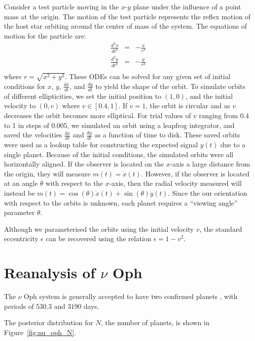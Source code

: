 \documentclass[useAMS,usenatbib]{mn2e}
\begin{document}
Consider a test particle moving in the $x$-$y$ plane under the influence of a
point mass at the origin. The motion of the test particle represents the
reflex motion of the host star orbiting around the center of mass of the
system. The equations of motion for the particle are:
\begin{eqnarray}
\frac{d^2x}{dt^2} &=& -\frac{x}{r^3} \\
\frac{d^2y}{dt^2} &=& -\frac{y}{r^3} \\
\end{eqnarray}
where $r = \sqrt{x^2 + y^2}$. These ODEs can be solved for any given set of
initial conditions for $x$, $y$, $\frac{dx}{dt}$, and $\frac{dy}{dt}$ to yield
the shape of the orbit. To simulate orbits
of different ellipticities, we set the initial position to $(1, 0)$, and
the initial velocity to $(0, v)$ where $v \in [0.4, 1]$.
If $v=1$, the orbit is circular and as $v$ decreases the orbit becomes more
elliptical. For trial values of $v$ ranging from 0.4 to 1 in steps of 0.005,
we simulated an orbit using a leapfrog integrator, and saved the
velocities $\frac{dx}{dt}$ and $\frac{dy}{dt}$ as a function of time to disk.
These saved orbits were used as a lookup table for constructing the expected
signal $y(t)$ due to a single planet.
Because of the initial conditions, the simulated orbits were all horizontally
aligned. If the observer is located on the $x$-axis a large distance
from the origin, they will measure $m(t) = \dot{x}(t)$. However, if the
observer is located at an angle $\theta$ with respect to the $x$-axis, then
the radial velocity measured will instead be
$m(t) = \cos(\theta)\dot{x}(t) + \sin(\theta)\dot{y}(t)$.
Since the our orientation with respect to the orbits is unknown, each planet
requires a ``viewing angle'' parameter $\theta$.

Although we parameterised the orbits using the initial velocity $v$,
the standard eccentricity $\epsilon$ can be recovered using the relation
$\epsilon = 1 - v^2$.

\section{Reanalysis of $\nu$ Oph}
The $\nu$ Oph system is generally accepted to have two confirmed planets
\citep[e.g.][]{2011AIPC.1331..102Q, 2012PASJ...64..135S, fengji}, with periods
of $530.3$ and $3190$ days.

The posterior distribution for $N$, the number of planets, is shown in
Figure~\ref{fig:nu_oph_N}.
\end{document}
